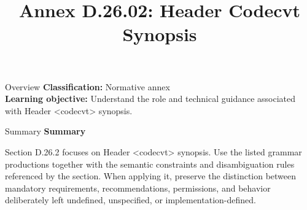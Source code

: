 \documentclass[10pt,letterpaper]{article}
\title{Annex D.26.02: Header Codecvt Synopsis}
\author{}
\date{}
\begin{document}
\maketitle
\begin{CornellOverviewBox}{Overview}
\textbf{Classification:} Normative annex\\[2pt]
\textbf{Learning objective:} Understand the role and technical guidance associated with Header <codecvt> synopsis.
\end{CornellOverviewBox}\begin{CornellSummaryBox}{Summary}
{\sffamily\bfseries\color{Accent} Summary}\par\vspace{3pt}Section D.26.2 focuses on Header <codecvt> synopsis. Use the listed grammar productions together with the semantic constraints and disambiguation rules referenced by the section. When applying it, preserve the distinction between mandatory requirements, recommendations, permissions, and behavior deliberately left undefined, unspecified, or implementation-defined.
\end{CornellSummaryBox}
\end{document}
